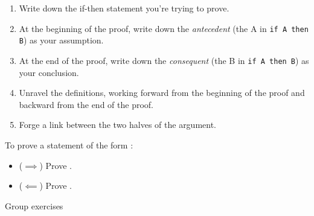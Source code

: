 \documentclass[10pt]{beamer}
\begin{document}

\begin{frame}

\begin{mybluebox}[title=Proof Template 1: Direct proof of an if-then theorem]

\begin{enumerate}
	\item Write down the if-then statement you're trying to prove. \pause  
	\item At the beginning of the proof, write down the \textit{antecedent} (the A in  \texttt{if A then B}) as your assumption. \pause 
	\item  At the end of the proof, write down the \textit{consequent} (the B in  \texttt{if A then B}) as your conclusion. \pause 
	\item Unravel the definitions, working forward from the beginning of the proof and backward from the end of the proof. \pause 
	\item Forge a link between the two halves of the argument.
\end{enumerate}
	
\end{mybluebox}
	
\end{frame}


\begin{frame}

\begin{mybluebox}[title=Proof Template 2: Direct proof of an if-and-only-if theorem]

To prove a statement of the form :
\begin{itemize}
\item ($\implies$) Prove .
\item ($\impliedby$) Prove .
\end{itemize}

	
\end{mybluebox}
	
\end{frame}


\begin{frame}[standout]
Group exercises

\end{frame}
\end{document}
